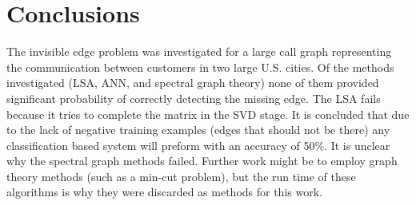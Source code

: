 \section{Conclusions}

The invisible edge problem was investigated for a large call graph representing the communication between customers in two large U.S. cities.
Of the methods investigated (LSA, ANN, and spectral graph theory) none of them provided significant probability of correctly detecting the missing edge.
The LSA fails because it tries to complete the matrix in the SVD stage.
It is concluded that due to the lack of negative training examples (edges that should not be there) any classification based system will preform with an accuracy of 50\%.
It is unclear why the spectral graph methods failed.
Further work might be to employ graph theory methods (such as a min-cut problem), but the run time of these algorithms is why they were discarded as methods for this work.
